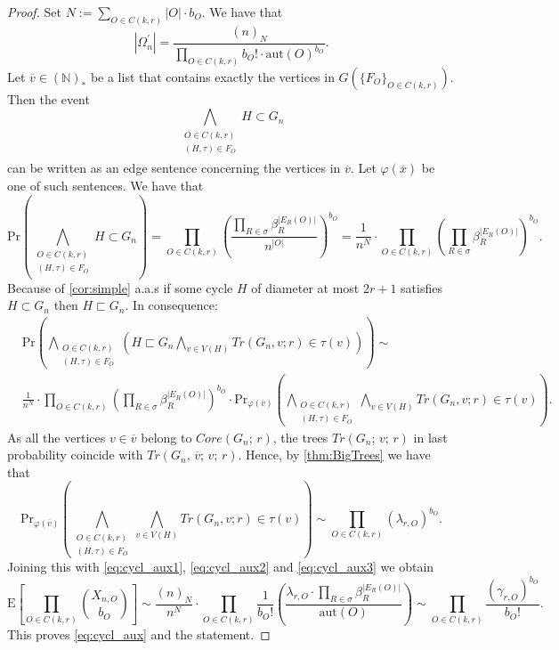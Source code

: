 \documentclass[12pt,notitlepage,a4paper]{article}
\theoremstyle{definition}
\newcommand{\N}{\mathbb{N}}
\newcommand{\aut}{\mathrm{aut}}
\begin{document}
\begin{proof}
Set $N:=\sum_{O\in C(k,r)} |O|\cdot b_O$. We have that
\begin{equation} \label{eq:cycl_aux2}
|\Omega_n^{\prime}|=
\frac{(n)_N}
{\prod_{O\in C(k,r)} b_O!\cdot \aut(O)^{b_O}}.
\end{equation}
Let $\overline{v}\in (\N)_*$ be 
a list that contains exactly the vertices in $G\left(
\{F_O\}_{O\in C(k,r)}	\right)$. Then the event
\[
\bigwedge_{
	\substack{
		O\in C(k,r)\\
		(H,\tau)\in F_O\\
}}
H\subset G_n
\]
can be written as an edge sentence concerning the vertices in $\overline{v}$.
Let $\varphi(\overline{x})$ be one of such sentences. We have that
\[
\mathrm{Pr}\left(
\bigwedge_{
	\substack{
		O\in C(k,r)\\
		(H,\tau)\in F_O\\
}}
H\subset G_n
\right)= \prod_{O\in C(k,r)} \left( \frac{\prod_{R\in \sigma}
\beta_R^{|E_R(O)|}}{n^{|O|}} \right)^{b_O}=
\frac{1}{n^N} \cdot
\prod_{O\in C(k,r)} \left( \prod_{R\in \sigma}
\beta_R^{|E_R(O)|} \right)^{b_O}.
\]
Because of \cref{cor:simple} a.a.s if some cycle $H$ of diameter at most
$2r+1$ satisfies $H\subset G_n$ then $H\sqsubset G_n$. In consequence:
\begin{align}
\nonumber
&\mathrm{Pr}\left(
\bigwedge_{
	\substack{
		O\in C(k,r)\\
		(H,\tau)\in F_O
}}
\left(
H\sqsubset G_n
\bigwedge_{v\in V(H)}
Tr(G_n,v;r)\in \tau(v)
\right)
\right) \sim \\ \label{eq:cycl_aux3}
&\frac{1}{n^N} \cdot
\prod_{O\in C(k,r)} \left( \prod_{R\in \sigma}
\beta_R^{|E_R(O)|} \right)^{b_O} \cdot
\mathrm{Pr}_{\varphi(\overline{v})}\left(
\bigwedge_{
	\substack{
		O\in C(k,r)\\
		(H,\tau)\in F_O
}}
\bigwedge_{v\in V(H)}
Tr(G_n,v;r)\in \tau(v)
\right).
\end{align}
As all the vertices $v\in \overline{v}$ belong to $Core(G_n;\,r)$, the
trees $Tr(G_n;\,v;\,r)$ in last probability coincide with 
$Tr(G_n,\,\overline{v};\, v;\, r)$. Hence, by \cref{thm:BigTrees}
we have that
\begin{equation*}
\mathrm{Pr}_{\varphi(\overline{v})}\left(
\bigwedge_{
	\substack{
		O\in C(k,r)\\
		(H,\tau)\in F_O
}}
\bigwedge_{v\in V(H)}
Tr(G_n,v;r)\in \tau(v)
\right) \sim 
\prod_{O\in C(k,r)} \left(
\lambda_{r,O}
\right)^{b_O}.
\end{equation*}
Joining this with \cref{eq:cycl_aux1}, \cref{eq:cycl_aux2} and \cref{eq:cycl_aux3} we obtain
\begin{equation*}
\mathrm{E}\left[
\prod_{O\in C(k,r)}
\binom{X_{n,O}}{b_O}
\right]\sim
\frac{(n)_N}{n^N}
\cdot
\prod_{O\in C(k,r)}
\frac{1}{b_O!}
\left(
\frac{\lambda_{r,O}\cdot\prod_{R\in\sigma} \beta_R^{|E_R(O)|}}{\aut(O)}
\right) \sim \prod_{O\in C(k,r)} \frac{(\gamma_{r,O})^{b_O}}{b_O!}.
\end{equation*}
This proves \cref{eq:cycl_aux} and the statement. 
\end{proof}
\end{document}
